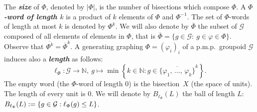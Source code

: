 \documentclass[AHL,Unicode,longabstracts,published]{cedram}
\newcommand{\defin}[1]{\textbf{\emph{#1}}}
\newcommand{\Nmath}{\mathbb{N}}
\newcommand{\cg}{\mathcal{G}}
\newcommand{\ph}{\varphi}
\newcommand{\pmp}{p.m.p.\ }
\begin{document}
The \defin{size} of $\Phi$, denoted by $|\Phi|$, is the number of bisections which compose $\Phi$. A \defin{$\Phi$-word of length $k$} is a product of $k$ elements of $\Phi$ and $\Phi^{-1}$. The set of $\Phi$-words of length at most $k$ is denoted by $\Phi^k$. We will also denote by $\overline \Phi$ the subset of $\cg$ composed of all elements of elements in $\Phi$, that is $\overline \Phi=\{g\in \cg:\ g\in\ph\in\Phi\}$. Observe that $\overline{\Phi^k}=\overline{\Phi}^k$. A generating graphing $\Phi=(\ph_i)_i$ of a \pmp groupoid $\cg$ induces also a \defin{length} as follows:
\begin{equation}\label{eq:length}
\ell_\Phi:\cg\rightarrow \Nmath,\ g\mapsto \min\left\lbrace k\in\Nmath: g\in \overline{\{\ph_1,\,\ldots,\,\ph_k\}}^k\right\rbrace.
\end{equation}
The empty word (the $\Phi$-word of length $0$) is the bisection~$X$ (the space of units). The length of every unit is $0$. We will denote by $B_{\ell_\Phi}(L)$ the ball of length $L$: $B_{\ell_\Phi}(L)\linebreak:= \{g \in \cg: \ell_\Phi(g) \leq L\}$.
\end{document}
